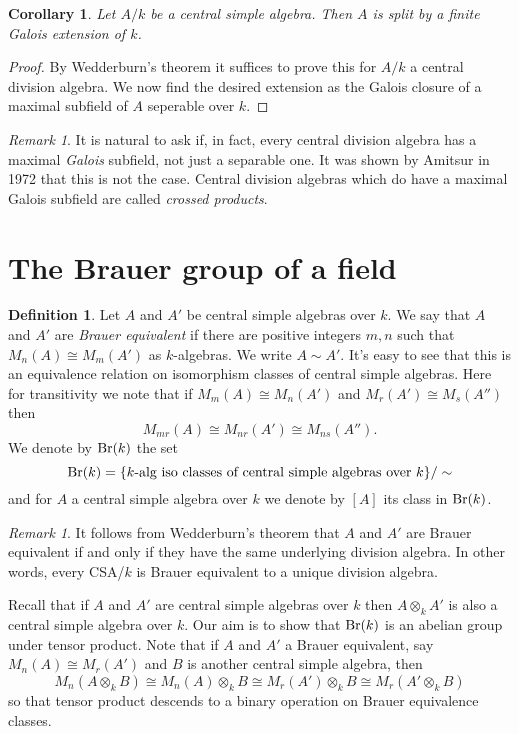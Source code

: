 \documentclass[11pt]{amsart}
\numberwithin{equation}{section}
\newtheorem{cor}[equation]{Corollary}
\theoremstyle{remark}
\newtheorem{remark}[equation]{Remark}
\theoremstyle{remark}
\theoremstyle{remark}
\theoremstyle{definition}
\theoremstyle{definition}
\theoremstyle{definition}
\newtheorem{defi}[equation]{Definition}
\theoremstyle{definition}
\theoremstyle{definition}
\theoremstyle{definition}
\begin{document}
\begin{cor} \label{Galois splitting field}
Let $A/k$ be a central simple algebra. Then $A$ is split by a finite Galois extension of $k$. 
\end{cor}

\begin{proof}
By Wedderburn's theorem it suffices to prove this for $A/k$ a central division algebra. We now find the desired extension as the Galois closure of a maximal subfield of $A$ seperable over $k$.
\end{proof}


\begin{remark}
It is natural to ask if, in fact, every central division algebra has a maximal \emph{Galois} subfield, not just a separable one. It was shown by Amitsur  in 1972 \cite{MR0318216} that this is not the case. Central division algebras which do have a maximal Galois subfield are called \emph{crossed products}.  
\end{remark}


\section{The Brauer group of a field}

\begin{defi} \label{Brauer equivalent}
Let $A$ and $A'$ be central simple algebras over $k$. We say that $A$ and $A'$ are \textit{Brauer equivalent} if there are positive integers $m,n$ such that $M_n(A)\cong M_m(A')$ as $k$-algebras. We write $A\sim A'$. It's easy to see that this is an equivalence relation on isomorphism classes of central simple algebras. Here for transitivity we note that if $M_m(A)\cong M_n(A')$ and $M_r(A')\cong M_s(A'')$ then \[M_{mr}(A)\cong M_{nr}(A')\cong M_{ns}(A'').\] 
We denote by $\textup{Br}(k)$ the set
\[\textup{Br}(k)=\{k\textup{-alg} \textup{ iso classes of central simple algebras over }k\}/\sim\]
and for $A$ a central simple algebra over $k$ we denote by $[A]$ its class in $\textup{Br}(k)$.
\end{defi}

\begin{remark}
It follows from Wedderburn's theorem that $A$ and $A'$ are Brauer equivalent if and only if they have the same underlying division algebra. In other words, every CSA/$k$ is Brauer equivalent to a unique division algebra.
\end{remark}

Recall that if $A$ and $A'$ are central simple algebras over $k$ then $A\otimes_k A'$ is also a central simple algebra over $k$. Our aim is to show that $\textup{Br}(k)$ is an abelian group under tensor product. Note that if $A$ and $A'$ a Brauer equivalent, say $M_n(A)\cong M_r(A')$ and $B$ is another central simple algebra, then \[M_n(A\otimes_k B)\cong M_n(A)\otimes_k B\cong M_r(A')\otimes_k B\cong M_r(A'\otimes_kB)\] so that tensor product descends to a binary operation on Brauer equivalence classes.
\end{document}
